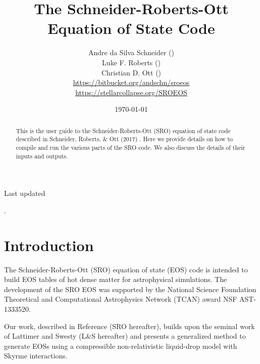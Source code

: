 \documentclass[letterpaper,11pt]{refart}
\title{The Schneider-Roberts-Ott Equation of State Code}
\author{Andre da Silva Schneider (\email{andschn@caltech.edu}) 
     \\ Luke F. Roberts (\email{robertsl@nscl.msu.edu})
     \\ Christian D. Ott (\email{cott@tapir.caltech.edu})
     \\ \url{https://bitbucket.org/andschn/sroeos}
     \\ \url{https://stellarcollapse.org/SROEOS}
     \\ \email{SROEOS@stellarcollapse.org}
       }
\date{}
\newcommand{\LS}{L\&S }
\begin{document}
\maketitle


\noindent \begin{flushright}{Last updated \date{\today}.}\end{flushright}

\begin{abstract}

This is the user guide to the Schneider-Roberts-Ott (SRO) equation of
state code described in Schneider, Roberts, \& Ott (2017)
\cite{schneider:17}.  Here we provide details on how to compile and
run the various parts of the SRO code. We also discuss the details of
their inputs and outputs.
\end{abstract}

\tableofcontents


\section{Introduction}

The Schneider-Roberts-Ott (SRO) equation of state (EOS) code is
intended to build EOS tables of hot dense matter for astrophysical
simulations. The development of the SRO EOS was supported by the
National Science Foundation Theoretical and Computational Astrophysics
Network (TCAN) award NSF AST-1333520.


Our work, described in Reference \cite{schneider:17} (SRO hereafter),
builds upon the seminal work of Lattimer and Swesty (\LS hereafter)
\cite{lattimer:91} and presents a generalized method to generate EOSs
using a compressible non-relativistic liquid-drop model with Skyrme
interactions.
\end{document}
